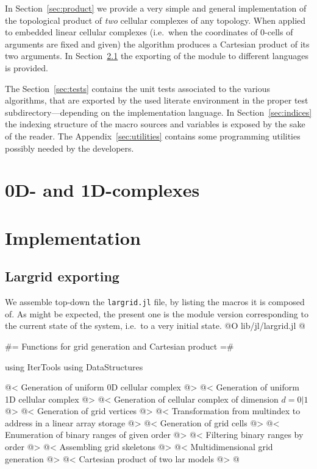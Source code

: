 In Section~\ref{sec:product} we provide a very simple and general implementation of the topological product of \emph{two} cellular complexes of any topology. When applied to embedded linear cellular complexes (i.e.~when the coordinates of 0-cells of arguments are fixed and given) the algorithm produces a Cartesian product of its two arguments.
In Section~\ref{sec:largrid} the exporting of the module to different languages is provided.

The Section~\ref{sec:tests} contains the unit tests associated to the various algorithms, that are exported by the used literate environment in the proper test subdirectory---depending on the implementation language.
In Section~\ref{sec:indices} the indexing structure of the macro sources and variables is exposed by the sake of the reader. 
The Appendix~\ref{sec:utilities} contains some programming utilities possibly needed by the developers.


\section{0D- and 1D-complexes}
\label{sec:0-1-complexes}

\section{Implementation}

\subsection{Largrid exporting}
\label{sec:largrid}
We assemble top-down the \texttt{largrid.jl} file, by listing the macros it is composed of. 
As might be expected, the present one is the module version corresponding to the current state of the system, i.e.~to a very initial state.
@O lib/jl/largrid.jl
@{
#= Functions for grid generation and Cartesian product =#

using IterTools
using DataStructures

@< Generation of uniform 0D cellular complex  @>
@< Generation of uniform 1D cellular complex  @>
@< Generation of cellular complex of dimension $d = 0 | 1$ @>
@< Generation of grid vertices  @>
@< Transformation from multindex to address in a linear array storage @>
@< Generation of grid cells  @>
@< Enumeration of binary ranges of given order @>
@< Filtering binary ranges by order @>
@< Assembling grid skeletons @>
@< Multidimensional grid generation @>
@< Cartesian product of two lar models   @>
@}



